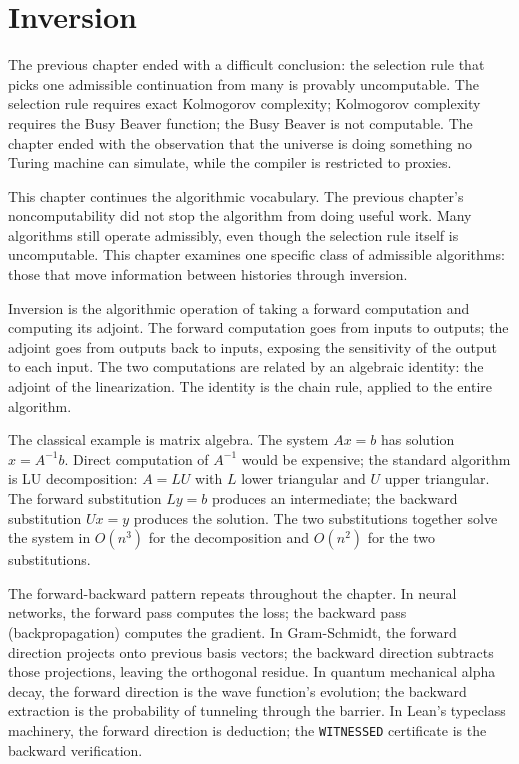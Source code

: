 \chapter{Inversion}
\label{chap:inversion}


\begin{chapteressay}

The previous chapter ended with a difficult conclusion: the selection
rule that picks one admissible continuation from many is provably
uncomputable. The selection rule requires exact Kolmogorov
complexity; Kolmogorov complexity requires the Busy Beaver function;
the Busy Beaver is not computable. The chapter ended with the
observation that the universe is doing something no Turing machine
can simulate, while the compiler is restricted to proxies.

This chapter continues the algorithmic vocabulary. The previous
chapter's noncomputability did not stop the algorithm from doing
useful work. Many algorithms still operate admissibly, even though
the selection rule itself is uncomputable. This chapter examines
one specific class of admissible algorithms: those that move
information between histories through inversion.

Inversion is the algorithmic operation of taking a forward
computation and computing its adjoint. The forward computation
goes from inputs to outputs; the adjoint goes from outputs back
to inputs, exposing the sensitivity of the output to each input.
The two computations are related by an algebraic identity: the
adjoint of the linearization. The identity is the chain rule,
applied to the entire algorithm.

The classical example is matrix algebra. The system $Ax = b$ has
solution $x = A^{-1} b$. Direct computation of $A^{-1}$ would be
expensive; the standard algorithm is LU decomposition: $A = LU$
with $L$ lower triangular and $U$ upper triangular. The forward
substitution $Ly = b$ produces an intermediate; the backward
substitution $Ux = y$ produces the solution. The two substitutions
together solve the system in $O(n^3)$ for the decomposition and
$O(n^2)$ for the two substitutions.

The forward-backward pattern repeats throughout the chapter. In
neural networks, the forward pass computes the loss; the backward
pass (backpropagation) computes the gradient. In Gram-Schmidt,
the forward direction projects onto previous basis vectors; the
backward direction subtracts those projections, leaving the
orthogonal residue. In quantum mechanical alpha decay, the forward
direction is the wave function's evolution; the backward
extraction is the probability of tunneling through the barrier.
In Lean's typeclass machinery, the forward direction is
deduction; the \texttt{WITNESSED} certificate is the backward
verification.


\end{chapteressay}
